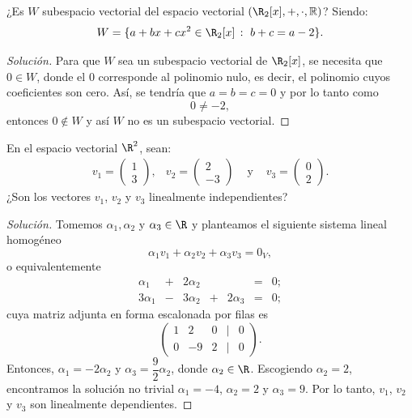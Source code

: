 \documentclass[a4,11pt]{aleph-notas}
\begin{document}
\begin{ejer}
    ¿Es $W$ subespacio vectorial del espacio vectorial $(\R_2[x], + , \cdot, \mathbb{R})$? Siendo: 
    \[W = \{ a + bx + cx^2 \in \R_2[x]\,:\, \, b + c = a - 2 \}.\]
\end{ejer}

\begin{proof}[Solución]\hspace{0pt}
    Para que $W$ sea un subespacio vectorial de $\R_2[x]$, se necesita que $0\in W$, donde el $0$ corresponde al polinomio nulo, es decir, el polinomio cuyos coeficientes son cero. Así, se tendría que $a=b=c=0$ y por lo tanto como
    \[
         0 \neq -2,
    \]
    entonces $0\notin W$ y así $W$ no es un subespacio vectorial. 
\end{proof}

\begin{ejer}
    En el espacio vectorial $\R^{2}$, sean:
    \[
        \begin{array}{cccc}
            v_1 = \begin{pmatrix} 1\\ 3 \end{pmatrix}, &
            v_2 = \begin{pmatrix} 2\\ -3 \end{pmatrix} &
            \text{ y } &
            v_3 = \begin{pmatrix} 0\\ 2 \end{pmatrix}.
        \end{array}
    \]
    ¿Son los vectores $v_1$, $v_2$ y $v_3$ linealmente independientes?
\end{ejer}

\begin{proof}[Solución]\hspace{0pt}
    Tomemos $\alpha_1, \alpha_2$ y $\alpha_3\in\R$ y planteamos el siguiente sistema lineal homogéneo
    \[
        \alpha_1 v_1 + \alpha_2 v_2 + \alpha_3 v_3 = 0_V,
    \]
    o equivalentemente
    \[
        \begin{array}{ccccccc}
            \alpha_1 & + & 2\alpha_2 & & & = & 0;\\
            3\alpha_1 & - & 3\alpha_2 & + & 2\alpha_3& = & 0;
        \end{array}
    \]
    cuya matriz adjunta en forma escalonada por filas es
    \[
        \begin{pmatrix}
            1 & 2 & 0 & | & 0\\
            0 & -9 & 2 & | & 0
        \end{pmatrix}.
    \]
    Entonces, $\alpha_1 = -2\alpha_2$ y $\alpha_3 = \dfrac{9}{2}\alpha_2$, donde $\alpha_2\in\R$. Escogiendo $\alpha_{2} = 2$, encontramos la solución no trivial $\alpha_{1}=-4$, $\alpha_2=2$ y $\alpha_3 = 9$. Por lo tanto, $v_1$, $v_2$ y $v_3$ son linealmente dependientes.
\end{proof}
\end{document}
